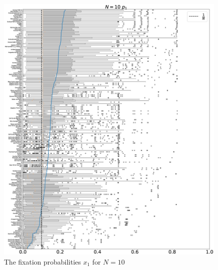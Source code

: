 \documentclass[10pt,letterpaper]{article}
\begin{document}
\begin{figure}[!hbtp]
    \centering
    \includegraphics[draft, width=\textwidth]{./Fig20.eps}
    \caption{The fixation probabilities \(x_1\) for \(N=10\)}
\end{figure}
\end{document}

